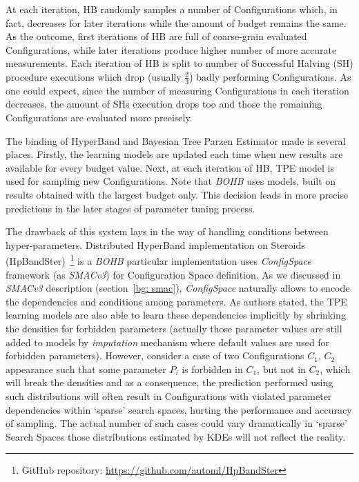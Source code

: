 At each iteration, HB randomly samples a number of Configurations which, in fact, decreases for later iterations while the amount of budget remains the same. As the outcome, first iterations of HB are full of coarse-grain evaluated Configurations, while later iterations produce higher number of more accurate measurements. Each iteration of HB is split to number of Successful Halving (SH) procedure executions which drop (usually $\frac{2}{3}$) badly performing Configurations. As one could expect, since the number of measuring Configurations in each iteration decreases, the amount of SHs execution drops too and those the remaining Configurations are evaluated more precisely.

The binding of HyperBand and Bayesian Tree Parzen Estimator made is several places. Firstly, the learning models are updated each time when new results are available for every budget value. Next, at each iteration of HB, TPE model is used for sampling new Configurations. Note that \textit{BOHB} uses models, built on results obtained with the largest budget only. This decision leads in more precise predictions in the later stages of parameter tuning process.

The drawback of this system lays in the way of handling conditions between hyper-parameters. Distributed HyperBand implementation on Steroids (HpBandSter)~\footnote[1]{GitHub repository: \url{https://github.com/automl/HpBandSter}} is a \textit{BOHB} particular implementation uses \textit{ConfigSpace} framework (as \textit{SMACv3}) for Configuration Space definition. As we discussed in \textit{SMACv3} description (section~\ref{bg: smac}), \textit{ConfigSpace} naturally allows to encode the dependencies and conditions among parameters. As authors stated, the TPE learning models are also able to learn these dependencies implicitly by shrinking the densities for forbidden parameters (actually those parameter values are still added to models by \textit{imputation} mechanism where default values are used for forbidden parameters). However, consider a case of two Configurations $C_1$, $C_2$ appearance such that some parameter $P_i$ is forbidden in $C_1$, but not in $C_2$, which will break the densities and as a consequence, the prediction performed using such distributions will often result in Configurations with violated parameter dependencies within `sparse' search spaces, hurting the performance and accuracy of sampling. The actual number of such cases could vary dramatically in `sparse' Search Spaces those distributions estimated by KDEs will not reflect the reality.


